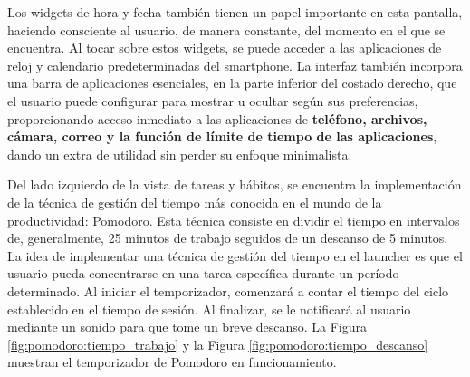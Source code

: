 Los widgets de hora y fecha también tienen un papel importante en esta pantalla, haciendo consciente al usuario, de manera constante, del momento en el que se encuentra. Al tocar sobre estos widgets, se puede acceder a las aplicaciones de reloj y calendario predeterminadas del smartphone. La interfaz también incorpora una barra de aplicaciones esenciales, en la parte inferior del costado derecho, que el usuario puede configurar para mostrar u ocultar según sus preferencias, proporcionando acceso inmediato a las aplicaciones de \textbf{teléfono, archivos, cámara, correo y la función de límite de tiempo de las aplicaciones}, dando un extra de utilidad sin perder su enfoque minimalista.

Del lado izquierdo de la vista de tareas y hábitos, se encuentra la implementación de la técnica de gestión del tiempo más conocida en el mundo de la productividad: Pomodoro. Esta técnica consiste en dividir el tiempo en intervalos de, generalmente, 25 minutos de trabajo seguidos de un descanso de 5 minutos. La idea de implementar una técnica de gestión del tiempo en el launcher es que el usuario pueda concentrarse en una tarea específica durante un período determinado. Al iniciar el temporizador, comenzará a contar el tiempo del ciclo establecido en el tiempo de sesión. Al finalizar, se le notificará al usuario mediante un sonido para que tome un breve descanso. La Figura \ref{fig:pomodoro:tiempo_trabajo} y la Figura \ref{fig:pomodoro:tiempo_descanso} muestran el temporizador de Pomodoro en funcionamiento.

